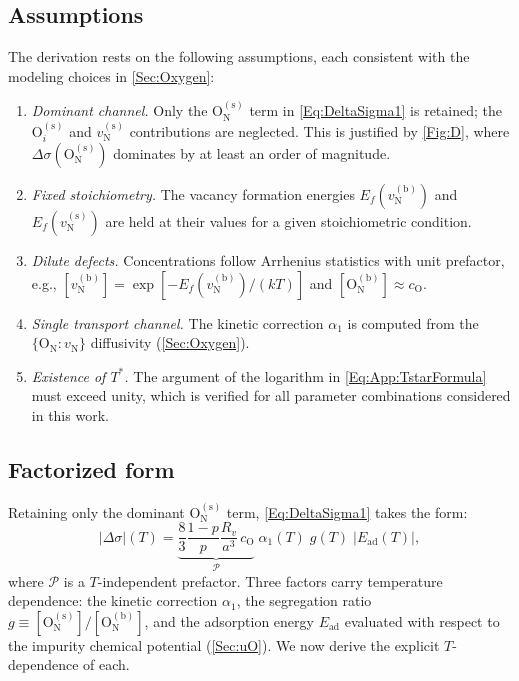 \documentclass[preprint,12pt,sort&compress]{elsarticle}
\newcommand{\?}{\stackrel{?}{=}}
\begin{document}
\subsection{Assumptions}
\label{App:Tpeak:Assumptions}

The derivation rests on the following assumptions, each consistent with the modeling choices in \cref{Sec:Oxygen}:
\begin{enumerate}[label=(\roman*)]
    \item \textit{Dominant channel.} Only the $\text{O}_\text{N}^{(\text{s})}$ term in \cref{Eq:DeltaSigma1} is retained; the $\text{O}_i^{(\text{s})}$ and $v_\text{N}^{(\text{s})}$ contributions are neglected. This is justified by \cref{Fig:D}, where $\Delta \sigma(\text{O}_\text{N}^{(\text{s})})$ dominates by at least an order of magnitude.
    \item \textit{Fixed stoichiometry.} The vacancy formation energies $E_f(v_\text{N}^{(\text{b})})$ and $E_f(v_\text{N}^{(\text{s})})$ are held at their values for a given stoichiometric condition.
    \item \textit{Dilute defects.} Concentrations follow Arrhenius statistics with unit prefactor, e.g., $[v_\text{N}^{(\text{b})}] = \exp[-E_f(v_\text{N}^{(\text{b})})/(kT)]$ and $[\text{O}_\text{N}^{(\text{b})}] \approx c_\text{O}$.
    \item \textit{Single transport channel.} The kinetic correction $\alpha_1$ is computed from the $\{\text{O}_\text{N} : v_\text{N}\}$ diffusivity (\cref{Sec:Oxygen}).
    \item \textit{Existence of $T^*$.} The argument of the logarithm in \cref{Eq:App:TstarFormula} must exceed unity, which is verified for all parameter combinations considered in this work.
\end{enumerate}

\subsection{Factorized form}
\label{App:Tpeak:Factorization}

Retaining only the dominant $\text{O}_\text{N}^{(\text{s})}$ term, \cref{Eq:DeltaSigma1} takes the form:
\begin{equation}
|\Delta \sigma|(T) = \underbrace{\frac{8}{3}\frac{1-p}{p}\frac{R_v}{a^3}\,c_\text{O}}_{\displaystyle\mathcal{P}}\;\alpha_1(T)\;g(T)\;|E_\text{ad}(T)|,
\label{Eq:App:Factorization}
\end{equation}
where $\mathcal{P}$ is a $T$-independent prefactor. Three factors carry temperature dependence: the kinetic correction $\alpha_1$, the segregation ratio $g \equiv [\text{O}_\text{N}^{(\text{s})}]/[\text{O}_\text{N}^{(\text{b})}]$, and the adsorption energy $E_\text{ad}$ evaluated with respect to the impurity chemical potential (\cref{Sec:uO}). We now derive the explicit $T$-dependence of each.
\end{document}
